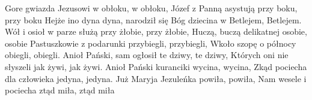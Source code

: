 \beginverse
Gore gwiazda Jezusowi w obłoku, w obłoku,
Józef z Panną asystują przy boku, przy boku
\endverse
\beginchorus
Hejże ino dyna dyna, narodził się Bóg dziecina
w Betlejem, Betlejem.
\endchorus
\beginverse
Wół i osioł w parze służą przy żłobie, przy żłobie,
Huczą, buczą delikatnej osobie, osobie
\endverse
\beginverse
Pastuszkowie z podarunki przybiegli, przybiegli,
Wkoło szopę o północy obiegli, obiegli.
\endverse
\beginverse
Anioł Pański, sam ogłosił te dziwy, te dziwy,
Których oni nie słyszeli jak żywi, jak żywi.
\endverse
\beginverse
Anioł Pański kuranciki wycina, wycina,
Zkąd pociecha dla człowieka jedyna, jedyna.
\endverse
\beginverse
Już Maryja Jezuleńka powiła, powiła,
Nam wesele i pociecha ztąd miła, ztąd miła
\endverse
\endsong
